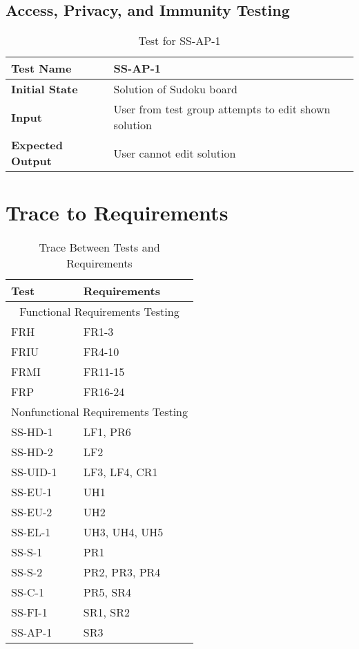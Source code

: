 \documentclass[11pt]{article}
\begin{document}
\subsection{Access, Privacy, and Immunity Testing}
\begin{table}[H]
\centering
\begin{tabularx}{\textwidth}{p{5cm}X}
\hline
\textbf{Test Name}       &  SS-AP-1\\ \hline
\textbf{Initial State}   &  Solution of Sudoku board\\ \hline
\textbf{Input}           &  User from test group attempts to edit shown solution\\ \hline
\textbf{Expected Output} &  User cannot edit solution\\ \hline
\end{tabularx}
\caption{Test for SS-AP-1}
\end{table}
		
\section{Trace to Requirements}
\begin{table}[H]
\centering
\begin{tabular}{p{} p{}}
\toprule
\textbf{Test} & \textbf{Requirements}\\
\midrule
\multicolumn{2}{c}{Functional Requirements Testing}\\
\midrule
FRH &  FR1-3\\
FRIU &  FR4-10\\
FRMI &  FR11-15\\
FRP &  FR16-24\\
\midrule
\multicolumn{2}{c}{Nonfunctional Requirements Testing}\\
\midrule
SS-HD-1 &  LF1, PR6\\
SS-HD-2 &  LF2\\
SS-UID-1 &  LF3, LF4, CR1\\
SS-EU-1 &  UH1\\
SS-EU-2 &  UH2\\
SS-EL-1 &  UH3, UH4, UH5\\
SS-S-1 &  PR1\\
SS-S-2 &  PR2, PR3, PR4\\
SS-C-1 &  PR5, SR4\\
SS-FI-1 &  SR1, SR2\\
SS-AP-1 &  SR3\\
\bottomrule
\end{tabular}
\caption{Trace Between Tests and Requirements}
\label{TblNFRT}
\end{table}
		
\end{document}
